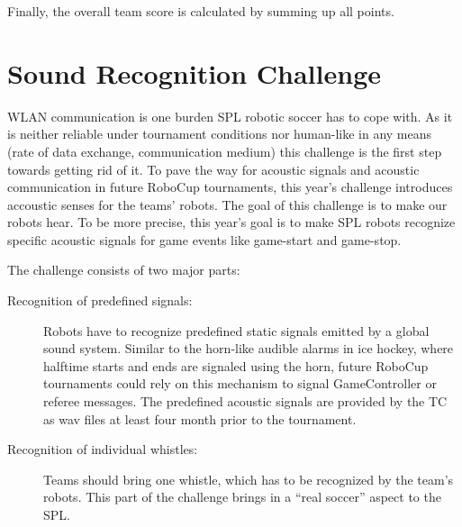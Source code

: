 \documentclass[12pt]{article}
\begin{document}
Finally, the overall team score is calculated by summing up all points.


\newpage





\section{Sound Recognition Challenge}

WLAN communication is one burden SPL robotic soccer has to cope with. As it is neither reliable under tournament conditions nor human-like in any means (rate of data exchange, communication medium) this challenge is the first step towards getting rid of it. To pave the way for acoustic signals and acoustic communication in future RoboCup tournaments, this year's challenge introduces accoustic senses for the teams' robots. The goal of this challenge is to make our robots hear. To be more precise, this year's goal is to make SPL robots recognize specific acoustic signals for game events like game-start and game-stop.

The challenge consists of two major parts:
\begin{description}
	\item[Recognition of predefined signals:]Robots have to recognize predefined static signals emitted by a global sound system. Similar to the horn-like audible alarms in ice hockey, where halftime starts and ends are signaled using the horn, future RoboCup tournaments could rely on this mechanism to signal GameController or referee messages. The predefined acoustic signals are provided by the TC as wav files at least four month prior to the tournament.
	
	\item[Recognition of individual whistles:]Teams should bring one whistle, which has to be recognized by the team's robots. This part of the challenge brings in a ``real soccer'' aspect to the SPL.
	
\end{description}
\end{document}
